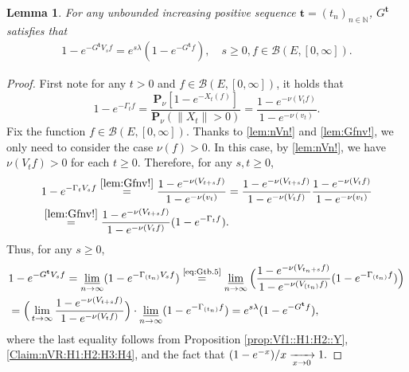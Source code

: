 \documentclass[12pt,a4paper]{amsart}
\numberwithin{equation}{section}
\theoremstyle{plain}
\newtheorem{lem}[thm]{Lemma}
\theoremstyle{definition}
\theoremstyle{remark}
\begin{document}
\begin{lem} \label{prop:Gtb:H1:H2:H3:H4}
	For any unbounded increasing positive sequence $\mathbf t = (t_n)_{n\in \mathbb N}$, $G^\mathbf t$ satisfies that
	\begin{align}
	1 - e^{-G^\mathbf t V_s f}
	= e^{s\lambda} (1-e^{- G^\mathbf t f}),
	\quad s\geq 0, f\in \mathcal B(E,[0,\infty]).
	\end{align}
\end{lem}
\begin{proof}
	First note for any $t>0$ and $f\in \mathcal B(E,[0,\infty])$, it holds that
\begin{equation}\label{lem:Gfnv!}
	1 - e^{- \Gamma_t f}
	= \frac{ \mathbf P_\nu [ 1 - e^{- X_t(f)}]}{ \mathbf P_\nu (\|X_t\| > 0)}
	= \frac{ 1 - e^{- \nu(V_tf)} }{ 1 - e^{- \nu(v_t)}}.
\end{equation}
	Fix the function $f\in \mathcal B(E,[0,\infty])$.
Thanks to \eqref{lem:nVn!} and \eqref{lem:Gfnv!}, we only need to consider the case $\nu(f) > 0$.
	In this case, by \eqref{lem:nVn!}, we have $\nu(V_tf)>0$ for each $t\geq 0$.
	Therefore, for any $s,t\geq 0$,
	\begin{align}
	& 1 - e^{- \Gamma_t V_s f}
	\overset{\eqref{lem:Gfnv!}}= \frac{ 1 - e^{- \nu(V_{t+s} f)} }{ 1 - e^{- \nu(v_t)}}
	= \frac{ 1 - e^{- \nu(V_{t+s} f)} }{ 1 - e^{- \nu(V_tf)}} \frac{ 1 - e^{ - \nu(V_tf)}}{ 1 - e^{- \nu(v_t)}}
	\\ &  \label{eq:Gtb.5}\overset{\eqref{lem:Gfnv!}}= \frac{ 1 - e^{- \nu(V_{t+s} f)} }{ 1 - e^{- \nu(V_tf)}} ( 1 - e^{- \Gamma_t f}).
	\end{align}
	Thus, for any $s\geq 0$,
	\begin{align}
	& 1 - e^{- G^{\mathbf t} V_s f}
	= \varliminf_{n\to \infty} ( 1 - e^{- \Gamma_{(t_n)} V_s f})
	\overset{\text{\eqref{eq:Gtb.5}}}= \varliminf_{n\to \infty} \Big( \frac{ 1 - e^{- \nu(V_{t_n+s}f)}}{ 1 - e^{- \nu(V_{(t_n)}f)}} (1 - e^{- \Gamma_{(t_n)} f}) \Big)
	\\& = \Big( \lim_{t \to \infty} \frac{ 1 - e^{- \nu(V_{t+s}f)}}{ 1 - e^{- \nu(V_{t}f)}} \Big) \cdot \varliminf_{n\to \infty} (1 - e^{- \Gamma_{(t_n)} f} )
	= e^{s\lambda} (1 - e^{- G^{\mathbf t}f}),
	\end{align}
	where the last equality follows from Proposition \ref{prop:Vf1::H1:H2::Y}, \eqref{Claim:nVR:H1:H2:H3:H4}, and the fact that
	$
	(1-e^{-x}) /x \xrightarrow[x\to 0]{} 1.
	\qedhere
	$
\end{proof}
\end{document}

